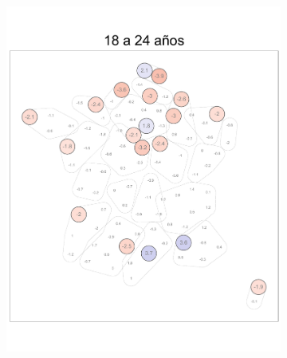 \begin{figure}
\begin{subfigure}{0.3\textwidth}
	\includegraphics[width = \textwidth]{Figs/Efectos/Dorling_Efectos_Ed2_Modelo_H}
	\end{subfigure}
	~
	\begin{subfigure}{0.3\textwidth}

\end{subfigure}
\end{figure}
